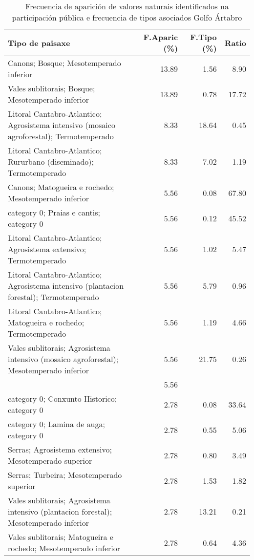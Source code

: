 \begin{table}[p]
\centering
\caption{Frecuencia de aparición de valores naturais identificados na participación pública e frecuencia de tipos asociados Golfo Ártabro} 
\label{vsixotnat1}
\begin{tabular}{lrrr}
  \hline
Tipo de paisaxe & F.Aparic (\%) & F.Tipo (\%) & Ratio \\ 
  \hline
Canons; Bosque; Mesotemperado inferior & 13.89 & 1.56 & 8.90 \\ 
  Vales sublitorais; Bosque; Mesotemperado inferior & 13.89 & 0.78 & 17.72 \\ 
  Litoral Cantabro-Atlantico; Agrosistema intensivo (mosaico agroforestal); Termotemperado & 8.33 & 18.64 & 0.45 \\ 
  Litoral Cantabro-Atlantico; Rururbano (diseminado); Termotemperado & 8.33 & 7.02 & 1.19 \\ 
  Canons; Matogueira e rochedo; Mesotemperado inferior & 5.56 & 0.08 & 67.80 \\ 
  category 0; Praias e cantis; category 0 & 5.56 & 0.12 & 45.52 \\ 
  Litoral Cantabro-Atlantico; Agrosistema extensivo; Termotemperado & 5.56 & 1.02 & 5.47 \\ 
  Litoral Cantabro-Atlantico; Agrosistema intensivo (plantacion forestal); Termotemperado & 5.56 & 5.79 & 0.96 \\ 
  Litoral Cantabro-Atlantico; Matogueira e rochedo; Termotemperado & 5.56 & 1.19 & 4.66 \\ 
  Vales sublitorais; Agrosistema intensivo (mosaico agroforestal); Mesotemperado inferior & 5.56 & 21.75 & 0.26 \\ 
   & 5.56 &  &  \\ 
  category 0; Conxunto Historico; category 0 & 2.78 & 0.08 & 33.64 \\ 
  category 0; Lamina de auga; category 0 & 2.78 & 0.55 & 5.06 \\ 
  Serras; Agrosistema extensivo; Mesotemperado superior & 2.78 & 0.80 & 3.49 \\ 
  Serras; Turbeira; Mesotemperado superior & 2.78 & 1.53 & 1.82 \\ 
  Vales sublitorais; Agrosistema intensivo (plantacion forestal); Mesotemperado inferior & 2.78 & 13.21 & 0.21 \\ 
  Vales sublitorais; Matogueira e rochedo; Mesotemperado inferior & 2.78 & 0.64 & 4.36 \\ 
   \hline
\end{tabular}
\end{table}
